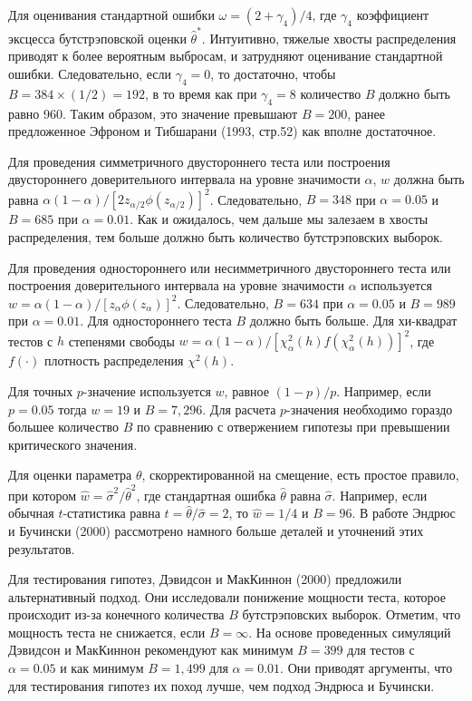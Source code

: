 Для оценивания стандартной ошибки $\omega=(2+\gamma_4)/4$, где $\gamma_4$ коэффициент эксцесса бутстрэповской оценки $\hat{\theta}^*$. Интуитивно,  тяжелые хвосты распределения приводят к более вероятным выбросам, и затрудняют оценивание  стандартной ошибки. Следовательно, если $\gamma_4=0$, то достаточно, чтобы $B=384{\times}(1/2)=192$, в то время как при $\gamma_4=8$ количество $B$ должно быть равно 960. Таким образом, это значение превышают $B=200$, ранее предложенное Эфроном и Тибшарани (1993, стр.52) как вполне достаточное.

Для проведения симметричного двустороннего теста или построения двустороннего доверительного интервала на уровне значимости $\alpha$, $w$ должна быть равна $\alpha(1-\alpha)/[2z_{\alpha/2}\phi(z_{\alpha/2})]^2$. Следовательно, $B=348$ при $\alpha=0.05$ и $B=685$ при $\alpha=0.01$. Как и ожидалось, чем дальше мы залезаем в хвосты распределения, тем больше должно быть количество бутстрэповских выборок.

Для проведения одностороннего или несимметричного двустороннего теста или построения доверительного интервала на уровне значимости $\alpha$ используется $w=\alpha(1-\alpha)/[z_{\alpha}\phi(z_{\alpha})]^2$. Следовательно, $B=634$ при $\alpha=0.05$ и $B=989$ при $\alpha=0.01$. Для одностороннего теста $B$ должно быть больше. Для хи-квадрат тестов с $h$ степенями свободы $w=\alpha(1-\alpha)/[\chi_{\alpha}^2(h)f(\chi_{\alpha}^2(h))]^2$, где $f(\cdot)$ плотность распределения $\chi^2(h)$.

Для точных $p$-значение используется $w$, равное $(1-p)/p$. Например, если $p=0.05$ тогда $w=19$ и $B=7,296$. Для расчета $p$-значения необходимо гораздо большее количество $B$ по сравнению с отвержением гипотезы при превышении критического значения.

Для оценки параметра $\theta$, скорректированной на смещение, есть простое правило, при котором $\hat{w}=\hat{\sigma}^2/\hat{\theta}^2$, где стандартная ошибка $\hat{\theta}$ равна $\hat{\sigma}$. Например, если обычная $t$-статистика равна $t=\hat{\theta}/\hat{\sigma}=2$, то $\hat{w}=1/4$ и $B=96$. В работе Эндрюс и Бучински (2000) рассмотрено намного больше деталей и уточнений этих результатов.

Для тестирования гипотез, Дэвидсон и МакКиннон (2000) предложили альтернативный подход. Они исследовали понижение мощности теста, которое происходит из-за  конечного количества $B$ бутстрэповских выборок. Отметим, что мощность теста не снижается, если $B=\infty$. На основе проведенных симуляций Дэвидсон и МакКиннон рекомендуют как минимум $B=399$ для тестов с $\alpha=0.05$ и как минимум $B=1,499$ для $\alpha=0.01$. Они приводят аргументы, что для тестирования гипотез их поход лучше, чем подход Эндрюса и Бучински.

